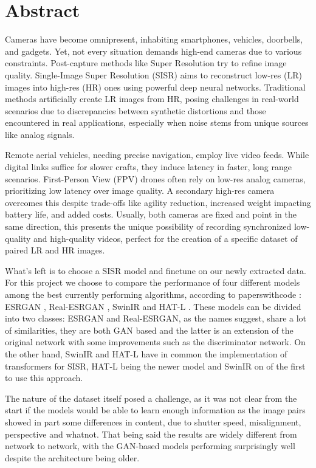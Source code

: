 \chapter*{Abstract}
\label{abstract}

Cameras have become omnipresent, inhabiting smartphones, vehicles, doorbells, and gadgets. Yet, not every situation demands high-end cameras due to various constraints. Post-capture methods like Super Resolution try to refine image quality. Single-Image Super Resolution (SISR) aims to reconstruct low-res (LR) images into high-res (HR) ones using powerful deep neural networks. Traditional methods artificially create LR images from HR, posing challenges in real-world scenarios due to discrepancies between synthetic distortions and those encountered in real applications, especially when noise stems from unique sources like analog signals.

Remote aerial vehicles, needing precise navigation, employ live video feeds. While digital links suffice for slower crafts, they induce latency in faster, long range scenarios. First-Person View (FPV) drones often rely on low-res analog cameras, prioritizing low latency over image quality. A secondary high-res camera overcomes this despite trade-offs like agility reduction, increased weight impacting battery life, and added costs. Usually, both cameras are fixed and point in the same direction, this presents the unique possibility of recording synchronized low-quality and high-quality videos, perfect for the creation of a specific dataset of paired LR and HR images.

What's left is to choose a SISR model and finetune on our newly extracted data. For this project we choose to compare the performance of four different models among the best currently performing algorithms, according to paperswithcode \cite{pwcode}: ESRGAN \cite{wang2018esrgan}, Real-ESRGAN \cite{wang2021realesrgan}, SwinIR \cite{liang2021swinir} and HAT-L \cite{chen2023activating}. These models can be divided into two classes: ESRGAN and Real-ESRGAN, as the names suggest, share a lot of similarities, they are both GAN based and the latter is an extension of the original network with some improvements such as the discriminator network. On the other hand, SwinIR and HAT-L have in common the implementation of transformers for SISR, HAT-L being the newer model and SwinIR on of the first to use this approach.

The nature of the dataset itself posed a challenge, as it was not clear from the start if the models would be able to learn enough information as the image pairs showed in part some differences in content, due to shutter speed, misalignment, perspective and whatnot. That being said the results are widely different from network to network, with the GAN-based models performing surprisingly well despite the architecture being older.

